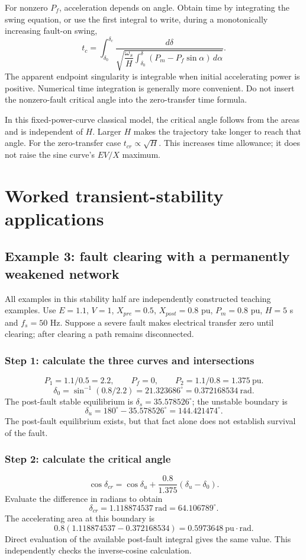 \documentclass[11pt,a4paper]{article}
\newenvironment{Idea}[1]{\begin{tcolorbox}[colback=pale,colframe=teal,coltitle=white,title={#1}]}{\end{tcolorbox}}
\newcommand{\chapterstart}[2]{\par\needspace{12\baselineskip}\section{#1}\label{#2}}
\newcommand{\ans}[1]{\boxed{#1}}
\begin{document}
For nonzero $P_f$, acceleration depends on angle. Obtain time by integrating the swing equation, or use the first integral to write, during a monotonically increasing fault-on swing,
\[
t_c=\int_{\delta_0}^{\delta_c}
\frac{d\delta}{\sqrt{\dfrac{\omega_s}{H}
\int_{\delta_0}^{\delta}(P_m-P_f\sin\alpha)\,d\alpha}}.
\]
The apparent endpoint singularity is integrable when initial accelerating power is positive. Numerical time integration is generally more convenient. Do not insert the nonzero-fault critical angle into the zero-transfer time formula.
\begin{Idea}{What changes with inertia?}
In this fixed-power-curve classical model, the critical angle follows from the areas and is independent of $H$. Larger $H$ makes the trajectory take longer to reach that angle. For the zero-transfer case $t_{cr}\propto\sqrt H$. This increases time allowance; it does not raise the sine curve's $EV/X$ maximum.
\end{Idea}

\chapterstart{Worked transient-stability applications}{applications}
\subsection{Example 3: fault clearing with a permanently weakened network}
All examples in this stability half are independently constructed teaching examples. Use $E=1.1$, $V=1$, $X_{pre}=0.5$, $X_{post}=0.8$ pu, $P_m=0.8$ pu, $H=5$ s and $f_s=50$ Hz. Suppose a severe fault makes electrical transfer zero until clearing; after clearing a path remains disconnected.
\subsubsection{Step 1: calculate the three curves and intersections}
\[
P_1=1.1/0.5=2.2,\qquad P_f=0,\qquad P_2=1.1/0.8=1.375\ \mathrm{pu}.
\]
\[
\delta_0=\sin^{-1}(0.8/2.2)=21.323686^\circ=0.372168534\ \mathrm{rad}.
\]
The post-fault stable equilibrium is $\delta_s=35.578526^\circ$; the unstable boundary is
\[
\delta_u=180^\circ-35.578526^\circ=144.421474^\circ.
\]
The post-fault equilibrium exists, but that fact alone does not establish survival of the fault.
\subsubsection{Step 2: calculate the critical angle}
\[
\cos\delta_{cr}=\cos\delta_u+
\frac{0.8}{1.375}(\delta_u-\delta_0).
\]
Evaluate the difference in radians to obtain
\[
\ans{\delta_{cr}=1.118874537\ \mathrm{rad}=64.106789^\circ}.
\]
The accelerating area at this boundary is
\[
0.8(1.118874537-0.372168534)=0.5973648\ \mathrm{pu\cdot rad}.
\]
Direct evaluation of the available post-fault integral gives the same value. This independently checks the inverse-cosine calculation.
\end{document}
